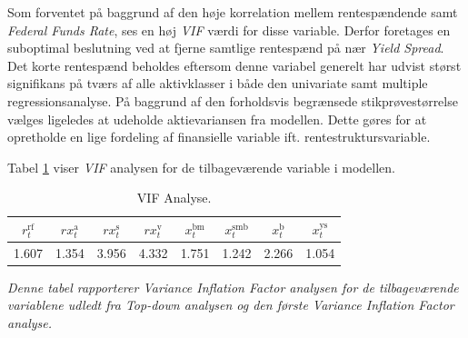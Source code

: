 \documentclass[
  a4paper,
  oneside]{memoir}
\begin{document}
\begin{table}[H]

\caption{\label{tab:VIF-TAB}VIF Analyse.}
\centering
{}
\end{table}

Som forventet på baggrund af den høje korrelation mellem rentespændende samt \emph{Federal Funds Rate}, ses en høj \emph{VIF} værdi for disse variable. Derfor foretages en suboptimal beslutning ved at fjerne samtlige rentespænd på nær \emph{Yield Spread}. Det korte rentespænd beholdes eftersom denne variabel generelt har udvist størst signifikans på tværs af alle aktivklasser i både den univariate samt multiple regressionsanalyse. På baggrund af den forholdsvis begrænsede stikprøvestørrelse vælges ligeledes at udeholde aktievariansen fra modellen. Dette gøres for at opretholde en lige fordeling af finansielle variable ift. rentestruktursvariable.

Tabel \ref{tab:VIF-TAB-PROD} viser \emph{VIF} analysen for de tilbageværende variable i modellen.

\begin{table}[H]

\caption{\label{tab:VIF-TAB-PROD}VIF Analyse.}
\centering
\begin{threeparttable}
\begin{tabular}[t]{cccccccc}
\toprule
$r_t^{\text{rf}}$ & $rx_t^{\text{a}}$ & $rx_t^{\text{s}}$ & $rx_t^{\text{v}}$ & $x_t^{\text{bm}}$ & $x_t^{\text{smb}}$ & $x_t^{\text{b}}$ & $x_t^{\text{ys}}$\\
\midrule
\rowcolor{gray!6}  1.607 & 1.354 & 3.956 & 4.332 & 1.751 & 1.242 & 2.266 & 1.054\\
\bottomrule
\end{tabular}
\begin{tablenotes}
\item \textit{Denne tabel rapporterer \textit{Variance Inflation Factor} analysen for de tilbageværende variablene udledt fra \textit{Top-down} analysen og den første \textit{Variance Inflation Factor} analyse.}
\end{tablenotes}
\end{threeparttable}
\end{table}
\end{document}
